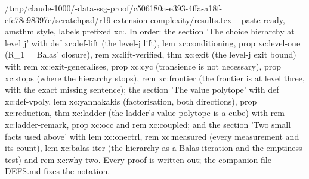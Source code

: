 /tmp/claude-1000/-data-ssg-proof/c506180a-e393-4ffa-a18f-efc78c98397e/scratchpad/r19-extension-complexity/results.tex -- paste-ready, amsthm style, labels prefixed xc:. In order: the section 'The choice hierarchy at level j' with def xc:def-lift (the level-j lift), lem xc:conditioning, prop xc:level-one (R_1 = Balas' closure), rem xc:lift-verified, thm xc:exit (the level-j exit bound) with rem xc:exit-generalises, prop xc:cyc (transience is not necessary), prop xc:stops (where the hierarchy stops), rem xc:frontier (the frontier is at level three, with the exact missing sentence); the section 'The value polytope' with def xc:def-vpoly, lem xc:yannakakis (factorisation, both directions), prop xc:reduction, thm xc:ladder (the ladder's value polytope is a cube) with rem xc:ladder-remark, prop xc:occ and rem xc:coupled; and the section 'Two small facts used above' with lem xc:onectrl, rem xc:measured (every measurement and its count), lem xc:balas-iter (the hierarchy as a Balas iteration and the emptiness test) and rem xc:why-two. Every proof is written out; the companion file DEFS.md fixes the notation.